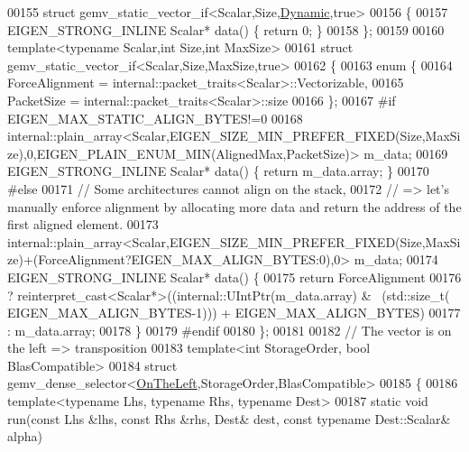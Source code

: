 \begin{DoxyCode}
00155 \textcolor{keyword}{struct }gemv\_static\_vector\_if<Scalar,Size,\hyperlink{namespace_eigen_ad81fa7195215a0ce30017dfac309f0b2}{Dynamic},true>
00156 \{
00157   EIGEN\_STRONG\_INLINE Scalar* data() \{ \textcolor{keywordflow}{return} 0; \}
00158 \};
00159 
00160 \textcolor{keyword}{template}<\textcolor{keyword}{typename} Scalar,\textcolor{keywordtype}{int} Size,\textcolor{keywordtype}{int} MaxSize>
00161 \textcolor{keyword}{struct }gemv\_static\_vector\_if<Scalar,Size,MaxSize,true>
00162 \{
00163   \textcolor{keyword}{enum} \{
00164     ForceAlignment  = internal::packet\_traits<Scalar>::Vectorizable,
00165     PacketSize      = internal::packet\_traits<Scalar>::size
00166   \};
00167 \textcolor{preprocessor}{  #if EIGEN\_MAX\_STATIC\_ALIGN\_BYTES!=0}
00168   
      internal::plain\_array<Scalar,EIGEN\_SIZE\_MIN\_PREFER\_FIXED(Size,MaxSize),0,EIGEN\_PLAIN\_ENUM\_MIN(AlignedMax,PacketSize)> m\_data;
00169   EIGEN\_STRONG\_INLINE Scalar* data() \{ \textcolor{keywordflow}{return} m\_data.array; \}
00170 \textcolor{preprocessor}{  #else}
00171   \textcolor{comment}{// Some architectures cannot align on the stack,}
00172   \textcolor{comment}{// => let's manually enforce alignment by allocating more data and return the address of the first
       aligned element.}
00173   
      internal::plain\_array<Scalar,EIGEN\_SIZE\_MIN\_PREFER\_FIXED(Size,MaxSize)+(ForceAlignment?EIGEN\_MAX\_ALIGN\_BYTES:0),0> m\_data;
00174   EIGEN\_STRONG\_INLINE Scalar* data() \{
00175     \textcolor{keywordflow}{return} ForceAlignment
00176             ? \textcolor{keyword}{reinterpret\_cast<}Scalar*\textcolor{keyword}{>}((internal::UIntPtr(m\_data.array) & ~(std::size\_t(
      EIGEN\_MAX\_ALIGN\_BYTES-1))) + EIGEN\_MAX\_ALIGN\_BYTES)
00177             : m\_data.array;
00178   \}
00179 \textcolor{preprocessor}{  #endif}
00180 \};
00181 
00182 \textcolor{comment}{// The vector is on the left => transposition}
00183 \textcolor{keyword}{template}<\textcolor{keywordtype}{int} StorageOrder, \textcolor{keywordtype}{bool} BlasCompatible>
00184 \textcolor{keyword}{struct }gemv\_dense\_selector<\hyperlink{group__enums_ggac22de43beeac7a78b384f99bed5cee0ba129609b3bdf23b071f5f86cf2f995ec4}{OnTheLeft},StorageOrder,BlasCompatible>
00185 \{
00186   \textcolor{keyword}{template}<\textcolor{keyword}{typename} Lhs, \textcolor{keyword}{typename} Rhs, \textcolor{keyword}{typename} Dest>
00187   \textcolor{keyword}{static} \textcolor{keywordtype}{void} run(\textcolor{keyword}{const} Lhs &lhs, \textcolor{keyword}{const} Rhs &rhs, Dest& dest, \textcolor{keyword}{const} \textcolor{keyword}{typename} Dest::Scalar& alpha)

\end{DoxyCode}
